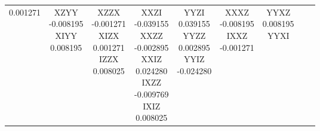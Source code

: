 \documentclass[twocolumn]{revtex4-1}
\newcommand{\1}{\mathbbm{1}}
\begin{document}
\begin{longtable}{|c|c|c|c|c|c|c|c|c|}
{0.001271\\ 
\vspace{.5\baselineskip}}
&
\parbox{1.9cm}{\centering\vspace{.5\baselineskip}
XZYY\\
-0.008195\\ 
XIYY\\
0.008195\\ 
\vspace{.5\baselineskip}}
&
\parbox{1.9cm}{\centering\vspace{.5\baselineskip}
XZZX\\
-0.001271\\ 
XIZX\\
0.001271\\ 
IZZX\\
0.008025\\ 
\vspace{.5\baselineskip}}
&
\parbox{1.9cm}{\centering\vspace{.5\baselineskip}
XXZI\\
-0.039155\\ 
XXZZ\\
-0.002895\\ 
XXIZ\\
0.024280\\ 
IXZZ\\
-0.009769\\ 
IXIZ\\
0.008025\\ 
\vspace{.5\baselineskip}}
&
\parbox{1.9cm}{\centering\vspace{.5\baselineskip}
YYZI\\
0.039155\\ 
YYZZ\\
0.002895\\ 
YYIZ\\
-0.024280\\ 
\vspace{.5\baselineskip}}
&
\parbox{1.9cm}{\centering\vspace{.5\baselineskip}
XXXZ\\
-0.008195\\ 
IXXZ\\
-0.001271\\ 
\vspace{.5\baselineskip}}
&
\parbox{1.9cm}{\centering\vspace{.5\baselineskip}
YYXZ\\
0.008195\\ 
YYXI\\
}
\end{longtable}
\end{document}
